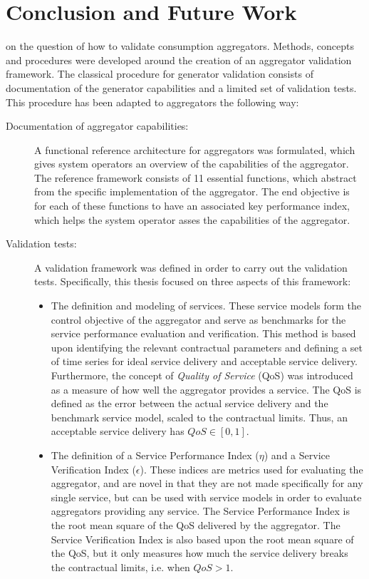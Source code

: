 \chapter{Conclusion and Future Work}
\label{cha:conclusion}
 on the question of how to validate consumption aggregators. Methods, concepts and procedures were developed around the creation of an aggregator validation framework. The classical procedure for generator validation consists of documentation of the generator capabilities and a limited set of validation tests. This procedure has been adapted to aggregators the following way:
\begin{description}
	\item[Documentation of aggregator capabilities:] A functional reference architecture for aggregators was formulated, which gives system operators an overview of the capabilities of the aggregator. The reference framework consists of 11 essential functions, which abstract from the specific implementation of the aggregator. The end objective is for each of these functions to have an associated key performance index, which helps the system operator asses the capabilities of the aggregator.
	\item[Validation tests:] A validation framework was defined in order to carry out the validation tests. Specifically, this thesis focused on three aspects of this framework:
		\begin{itemize}
			\item The definition and modeling of services. These service models form the control objective of the aggregator and serve as benchmarks for the service performance evaluation and verification. This method is based upon identifying the relevant contractual parameters and defining a set of time series for ideal service delivery and acceptable service delivery. Furthermore, the concept of \emph{Quality of Service} (QoS) was introduced as a measure of how well the aggregator provides a service. The QoS is defined as the error between the actual service delivery and the benchmark service model, scaled to the contractual limits. Thus, an acceptable service delivery has $QoS \in [0,1]$.
			\item The definition of a Service Performance Index ($\eta$) and a Service Verification Index ($\epsilon$). These indices are metrics used for evaluating the aggregator, and are novel in that they are not made specifically for any single service, but can be used with service models in order to evaluate aggregators providing any service. The Service Performance Index is the root mean square of the QoS delivered by the aggregator. The Service Verification Index is also based upon the root mean square of the QoS, but it only measures how much the service delivery breaks the contractual limits, i.e. when $QoS > 1$.

\end{itemize}
\end{description}
